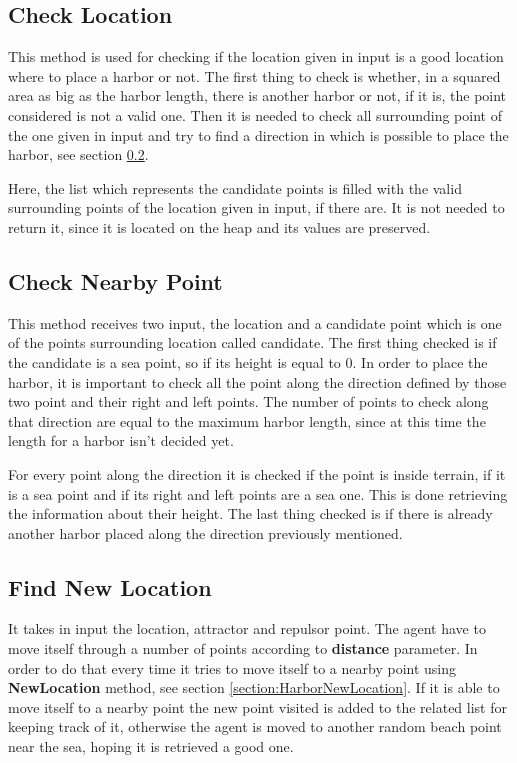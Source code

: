\documentclass[12pt]{article}
\begin{document}
    \subsection{Check Location} \label{harbor:checkLocation}
    This method is used for checking if the location given in input is a good location where to place a harbor or not. The first thing to check is whether, in a squared area
    as big as the harbor length, there is another harbor or not, if it is, the point considered is not a valid one. Then it is needed to check all surrounding point of the 
    one given in input and try to find a direction in which is possible to place the harbor, see section \ref{section:harborNearby}.

    Here, the list which represents the candidate points is filled with the valid surrounding points of the location given in input, if there are. It is not needed to return it,
    since it is located on the heap and its values are preserved. 
    
    \subsection{Check Nearby Point} \label{section:harborNearby}
    This method receives two input, the location and a candidate point which is one of the points surrounding location called candidate. The first thing checked is
    if the candidate is a sea point, so if its height is equal to 0. In order to place the harbor, it is important to check all the point along the direction defined by those
    two point and their right and left points. The number of points to check along that direction are equal to the maximum harbor length, since at this time the length for 
    a harbor isn't decided yet.

    For every point along the direction it is checked if the point is inside terrain, if it is a sea point and if its right and left points are a sea one. This is done
    retrieving the information about their height. The last thing checked is if there is already another harbor placed along the direction previously mentioned.

    \subsection{Find New Location} \label{section:harborNew}
    It takes in input the location, attractor and repulsor point. The agent have to move itself through a number of points according to \textbf{distance} parameter. In order
    to do that every time it tries to move itself to a nearby point using \textbf{NewLocation} method, see section \ref{section:HarborNewLocation}. If it is able to move itself to a
    nearby point the new point visited is added to the related list for keeping track of it, otherwise the agent is moved to another random beach point near the sea, hoping
    it is retrieved a good one.
\end{document}
